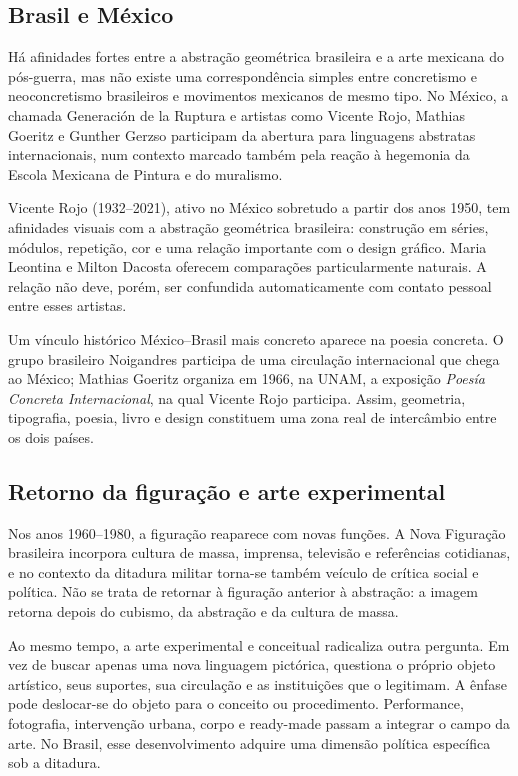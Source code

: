 \subsection{Brasil e México}

Há afinidades fortes entre a abstração geométrica brasileira e a arte mexicana
do pós-guerra, mas não existe uma correspondência simples entre concretismo e
neoconcretismo brasileiros e movimentos mexicanos de mesmo tipo. No México,
a chamada Generación de la Ruptura e artistas como Vicente Rojo, Mathias
Goeritz e Gunther Gerzso participam da abertura para linguagens abstratas
internacionais, num contexto marcado também pela reação à hegemonia da Escola
Mexicana de Pintura e do muralismo.

Vicente Rojo (1932--2021), ativo no México sobretudo a partir dos anos 1950,
tem afinidades visuais com a abstração geométrica brasileira: construção em
séries, módulos, repetição, cor e uma relação importante com o design gráfico.
Maria Leontina e Milton Dacosta oferecem comparações particularmente naturais.
A relação não deve, porém, ser confundida automaticamente com contato pessoal
entre esses artistas.

Um vínculo histórico México--Brasil mais concreto aparece na poesia concreta.
O grupo brasileiro Noigandres participa de uma circulação internacional que
chega ao México; Mathias Goeritz organiza em 1966, na UNAM, a exposição
\emph{Poesía Concreta Internacional}, na qual Vicente Rojo participa. Assim,
geometria, tipografia, poesia, livro e design constituem uma zona real de
intercâmbio entre os dois países.

\subsection{Retorno da figuração e arte experimental}

Nos anos 1960--1980, a figuração reaparece com novas funções. A Nova Figuração
brasileira incorpora cultura de massa, imprensa, televisão e referências
cotidianas, e no contexto da ditadura militar torna-se também veículo de
crítica social e política. Não se trata de retornar à figuração anterior à
abstração: a imagem retorna depois do cubismo, da abstração e da cultura de
massa.

Ao mesmo tempo, a arte experimental e conceitual radicaliza outra pergunta. Em
vez de buscar apenas uma nova linguagem pictórica, questiona o próprio objeto
artístico, seus suportes, sua circulação e as instituições que o legitimam. A
ênfase pode deslocar-se do objeto para o conceito ou procedimento. Performance,
fotografia, intervenção urbana, corpo e ready-made passam a integrar o campo da
arte. No Brasil, esse desenvolvimento adquire uma dimensão política específica
sob a ditadura.

